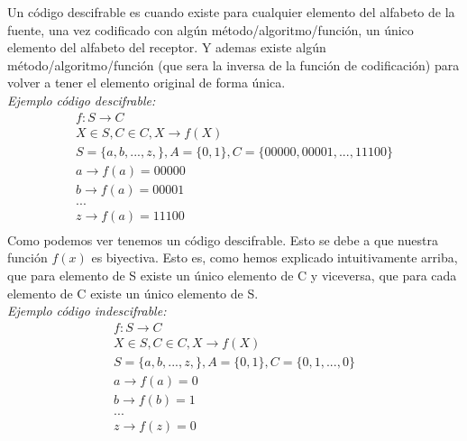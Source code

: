 \documentclass[12pt,a4paper]{article}
\begin{document}
\begin{enumerate}
	Un código descifrable es cuando existe para cualquier elemento del alfabeto de la fuente, una vez codificado con  algún método/algoritmo/función, un único elemento del alfabeto del receptor. Y ademas existe algún método/algoritmo/función (que sera la inversa de la función de codificación) para volver a tener el elemento original de forma única. 
	\\
	\textsl{Ejemplo código descifrable:}
	\\
	$$
	\begin{array}{c}{f: S \rightarrow C} \\ {X \in S, C \in C, X \rightarrow f(X)}		\\ S=\{a,b,...,z,\},A=\{0,1\},C=\{00000,00001,...,11100\}\\
a\rightarrow f(a) = 00000\\
b\rightarrow f(a) = 00001\\...\\
z\rightarrow f(a) = 11100\\
\end{array}
	$$
	Como podemos ver tenemos un código descifrable. Esto se debe a que nuestra función $f(x)$ es biyectiva. Esto es, como hemos explicado intuitivamente arriba, que para elemento de S existe un único elemento de C y viceversa, que para cada elemento de C existe un único elemento de S.	\\
	\textsl{Ejemplo código indescifrable:}
		$$
	\begin{array}{c}{f: S \rightarrow C} \\ {X \in S, C \in C, X \rightarrow f(X)}		\\ S=\{a,b,...,z,\},A=\{0,1\},C=\{0,1,...,0\}\\
	a\rightarrow f(a) = 0\\
	b\rightarrow f(b) = 1\\...\\
	z\rightarrow f(z) = 0\\
	\end{array}
	$$


\end{enumerate}
\end{document}
